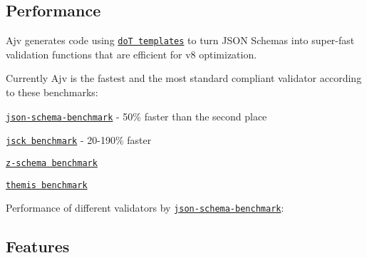 \subsection*{Performance}

Ajv generates code using \href{https://github.com/olado/doT}{\tt doT templates} to turn J\+S\+ON Schemas into super-\/fast validation functions that are efficient for v8 optimization.

Currently Ajv is the fastest and the most standard compliant validator according to these benchmarks\+:


\begin{DoxyItemize}
\item \href{https://github.com/ebdrup/json-schema-benchmark}{\tt json-\/schema-\/benchmark} -\/ 50\% faster than the second place
\item \href{https://github.com/pandastrike/jsck#benchmarks}{\tt jsck benchmark} -\/ 20-\/190\% faster
\item \href{https://rawgit.com/zaggino/z-schema/master/benchmark/results.html}{\tt z-\/schema benchmark}
\item \href{https://cdn.rawgit.com/playlyfe/themis/master/benchmark/results.html}{\tt themis benchmark}
\end{DoxyItemize}

Performance of different validators by \href{https://github.com/ebdrup/json-schema-benchmark}{\tt json-\/schema-\/benchmark}\+:

\href{https://github.com/ebdrup/json-schema-benchmark/blob/master/README.md#performance}{\tt }

\subsection*{Features}


